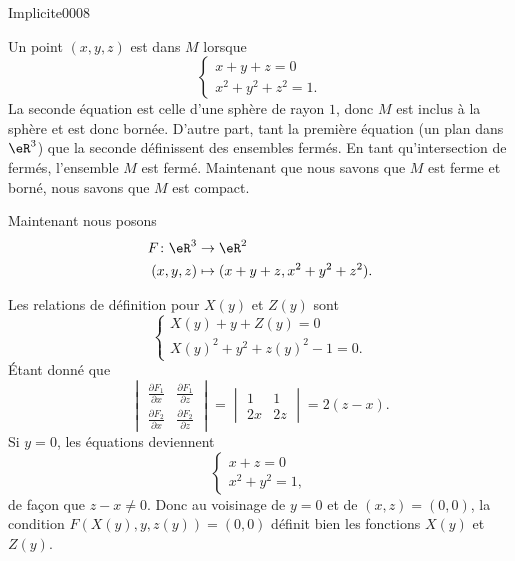 
\begin{corrige}{Implicite0008}

	Un point $(x,y,z)$ est dans $M$ lorsque
	\begin{equation}
		\left\{
		\begin{array}{ll}
			x+y+z=0\\
			x^2+y^2+z^2=1.
		\end{array}
		\right.
	\end{equation}
	La seconde équation est celle d'une sphère de rayon $1$, donc $M$ est inclus à la sphère et est donc bornée. D'autre part, tant la première équation (un plan dans $\eR^3$) que la seconde définissent des ensembles fermés. En tant qu'intersection de fermés, l'ensemble $M$ est fermé. Maintenant que nous savons que $M$ est ferme et borné, nous savons que $M$ est compact.

	Maintenant nous posons
	\begin{equation}
		\begin{aligned}
			F\colon \eR^3&\to \eR^2 \\
			(x,y,z)&\mapsto (x+y+z,x^2+y^2+z^2). 
		\end{aligned}
	\end{equation}

	Les relations de définition pour $X(y)$ et $Z(y)$ sont
	\begin{equation}			\label{EqHuitEqsqDefXZ}
		\left\{
		\begin{array}{ll}
			X(y)+y+Z(y)=0\\
			X(y)^2+y^2+z(y)^2-1=0.
		\end{array}
		\right.
	\end{equation}
	Étant donné que
	\begin{equation}
		\begin{vmatrix}
			\frac{ \partial F_1 }{ \partial x }	&	\frac{ \partial F_1 }{ \partial z }	\\ 
			\frac{ \partial F_2 }{ \partial x }	&	\frac{ \partial F_2 }{ \partial z }	
		\end{vmatrix}
		=
		\begin{vmatrix}
			1	&	1	\\ 
			2x	&	2z	
		\end{vmatrix}
		=
		2(z-x).
	\end{equation}
	Si $y=0$, les équations deviennent
	\begin{equation}
		\left\{
		\begin{array}{ll}
			x+z=0\\
			x^2+y^2=1,
		\end{array}
		\right.
	\end{equation}
	de façon que $z-x\neq 0$. Donc au voisinage de $y=0$ et de $(x,z)=(0,0)$, la condition $F(X(y),y,z(y))=(0,0)$ définit bien les fonctions $X(y)$ et $Z(y)$.


\end{corrige}
